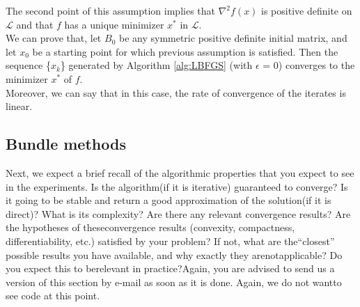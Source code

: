 The second point of this assumption implies that $\nabla^2f(x)$ is positive definite on $\mathcal{L}$ and that $\mathit{f}$ has a unique minimizer $x^*$ in $\mathcal{L}$.
\\
We can prove that, let $B_0$ be any symmetric positive definite initial matrix, and let $x_0$ be a starting point for which previous assumption is satisfied. Then the sequence \{$x_k$\} generated by Algorithm \ref{alg:LBFGS} (with $\epsilon$ = 0) converges to the minimizer $x^*$ of $\mathit{f}$.
\\
Moreover, we can say that in this case, the rate of convergence of the iterates
is linear.






 

\subsection{Bundle methods}


Next, we expect a brief recall of the algorithmic properties that you expect to see in the experiments. Is the algorithm(if it is iterative) guaranteed to converge? Is it going to be stable and return a good approximation of the solution(if it is direct)? What is its complexity? Are there any relevant convergence results? Are the hypotheses of theseconvergence results (convexity, compactness, differentiability, etc.) satisfied by your problem? If not, what are the“closest” possible results you have available, and why exactly they arenotapplicable?  Do you expect this to berelevant in practice?Again, you are advised to send us a version of this section by e-mail as soon as it is done. Again, we do not wantto see code at this point.